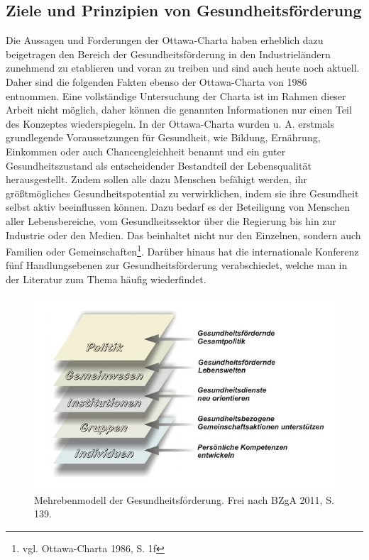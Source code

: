 \subsection{Ziele und Prinzipien von Gesundheitsförderung}
\label{sec:ZieleUndPrinzipienVonGesundheitsförderung}

Die Aussagen und Forderungen der Ottawa-Charta haben erheblich dazu beigetragen den Bereich der Gesundheitsförderung in den Industrieländern zunehmend zu etablieren und voran zu treiben und sind auch heute noch aktuell.  Daher sind die folgenden Fakten ebenso der Ottawa-Charta von 1986 entnommen. Eine vollständige Untersuchung der Charta ist im Rahmen dieser Arbeit nicht möglich, daher können die genannten Informationen nur einen Teil des Konzeptes wiederspiegeln.
In  der Ottawa-Charta wurden u. A. erstmals grundlegende Voraussetzungen für Gesundheit, wie Bildung, Ernährung, Einkommen oder auch Chancengleichheit benannt und ein guter Gesundheitszustand als entscheidender Bestandteil der Lebensqualität herausgestellt. Zudem sollen alle dazu Menschen befähigt werden, ihr größtmögliches Gesundheitspotential zu verwirklichen, indem sie ihre Gesundheit selbst aktiv beeinflussen können. Dazu bedarf es der Beteiligung von Menschen aller Lebensbereiche, vom Gesundheitssektor über die Regierung bis hin zur Industrie oder den Medien. Das beinhaltet nicht nur den Einzelnen, sondern auch Familien oder Gemeinschaften\footnote{vgl. Ottawa-Charta 1986, S. 1f}. Darüber hinaus hat die internationale Konferenz fünf Handlungsebenen zur Gesundheitsförderung verabschiedet, welche man in der Literatur zum Thema häufig wiederfindet.

\begin{figure}[h]
	\centering
		\includegraphics[scale=0.45]{mehrebenenmodell.jpg}
	\caption{Mehrebenmodell der Gesundheitsförderung. Frei nach BZgA 2011, S. 139.}
	\label{fig:mehrebenenmodell}
\end{figure}

